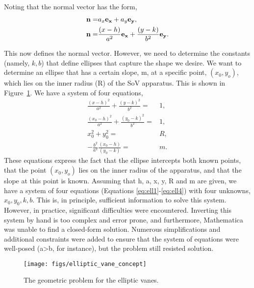 Noting that the normal vector has the form, 
\begin{eqnarray}
 {\bf n} =& {a_x} {\bf e_x} + {a_y}{\bf e_y}, \label{eqn:a_x}\\
 {\bf n} =& \frac{(x-h)}{a^2} {\bf e_x} + \frac{(y-k)}{b^2} {\bf e_y}.
\end{eqnarray}

This now defines the normal vector. However, we need to determine the 
constants (namely, $k,b$) that define ellipses that capture the shape we
desire. We want to determine an ellipse that has a certain
slope, m, at a specific point,  $(x_0,y_o)$, which lies on the inner
radius (R) of the SoV apparatus. This is shown in
Figure~\ref{fig:elliptic_vane_concept}. We have a system of four
equations,
\begin{eqnarray}
 \frac{(x-h)^2}{a^2} + \frac{(y-k)^2}{b^2} =& 1, \label{eq:ell1}\\
 \frac{(x_0-h)^2}{a^2} + \frac{(y_0-k)^2}{b^2} =& 1, \label{eq:ell2}  \\
 x_0^2 + y_0^2 =& R, \label{eq:ell3} \\
 -\frac{b^2}{a^2}\frac{(x_0-h)}{(y_0-k)} =& m. \label{eq:ell4} 
\end{eqnarray}
These equations express the fact that the ellipse intercepts both known
points, that the point $(x_0,y_o)$ lies on the inner radius of the
apparatus, and that the slope at this point is known. Assuming that
h, a, x, y, R and m are given, we have a system of four equations
(Equations \ref{eq:ell1}-\ref{eq:ell4}) with four unknowns,
$x_0,y_0,k,b$. This is, in principle, sufficient information to solve
this system. However, in practice, significant difficulties were
encountered. Inverting this system by hand is too complex and error
prone, and furthermore, Mathematica was unable to find a closed-form
solution. Numerous simplifications and additional constraints were added
to ensure that the system of equations were well-posed (a>b, for
instance), but the problem still resisted solution. 

 \begin{figure}[!htb]
  \begin{center}
   \texttt{[image: figs/elliptic\_vane\_concept]}
   \caption{The geometric problem for the elliptic vanes.}
   \label{fig:elliptic_vane_concept}
  \end{center}
 \end{figure}

